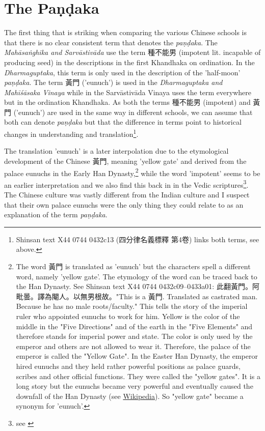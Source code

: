 \section{The Paṇḍaka}

The first thing that is striking when comparing the various Chinese schools is that there is no clear consistent term that denotes the {\em paṇḍaka}. The {\em Mahāsaṅghika and Sarvāstivāda} use the term 種不能男 (impotent lit. incapable of producing seed) in the descriptions in the first Khandhaka on ordination. In the {\em Dharmaguptaka}, this term is only used in the description of the 'half-moon' {\em paṇḍaka}. The term 黃門 ('eunuch') is used in the {\em Dharmaguptaka and Mahīśāsaka Vinaya} while in the Sarvāstivāda Vinaya uses the term everywhere but in the ordination Khandhaka. As both the terms 種不能男 (impotent) and 黃門 ('eunuch') are used in the same way in different schools, we can assume that both can denote {\em paṇḍaka} but that the difference in terms point to historical changes in understanding and translation\footnote{Shinsan text X44 0744 0432c13 (四分律名義標釋 第4卷) links both terms, see above.}.

The translation 'eunuch' is a later interpolation due to the etymological development of the Chinese 黃門, meaning 'yellow gate' and derived from the palace eunuchs in the Early Han Dynasty,\footnote{The word 黃門 is translated as 'eunuch' but the characters spell a different word, namely 'yellow gate'. The etymology of the word can be traced back to the Han Dynasty. See Shinsan text X44 0744 0432c09–0433a01: 此翻黃門。阿毗曇。譯為閹人。以無男根故。"This is a 黃門. Translated as castrated man. Because he has no male roots/faculty." This tells the story of the imperial ruler who appointed eunuchs to work for him. Yellow is the color of the middle in the "Five Directions" and of the earth in the "Five Elements" and therefore stands for imperial power and state. The color is only used by the emperor and others are not allowed to wear it. Therefore, the palace of the emperor is called the "Yellow Gate". In the Easter Han Dynasty, the emperor hired eunuchs and they held rather powerful positions as palace guards, scribes and other official functions. They were called the "yellow gates". It is a long story but the eunuchs became very powerful and eventually caused the downfall of the Han Dynasty (see \href{https://en.wikipedia.org/wiki/Han_dynasty}{Wikipedia}). So "yellow gate" became a synonym for 'eunuch'.} while the word 'impotent' seems to be an earlier interpretation and we also find this back in in the Vedic scriptures\footnote{see \cite{zwilling}}. The Chinese culture was vastly different from the Indian culture and I suspect that their own palace eunuchs were the only thing they could relate to as an explanation of the term {\em paṇḍaka}.

